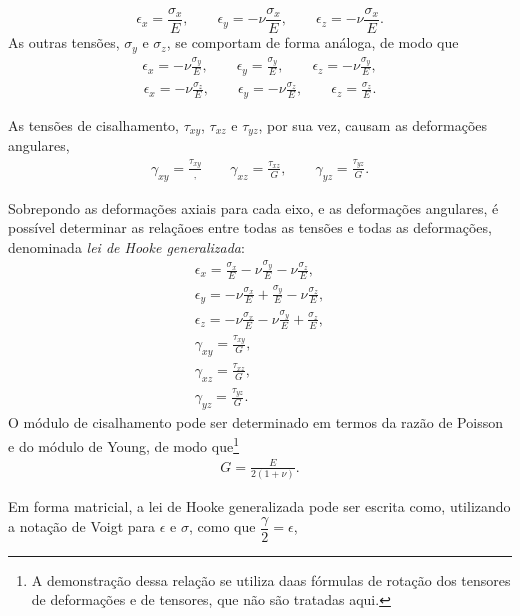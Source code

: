 \begin{equation}
    \epsilon_x =\frac{\sigma_x}{E}, \qquad \epsilon_y = -\nu \frac{\sigma_x}{E}, \qquad \epsilon_z = -\nu \frac{\sigma_x}{E}.
\end{equation}
As outras tensões, $\sigma_y$ e $\sigma_z$, se comportam de forma análoga, de modo que
\begin{gather}
    \epsilon_x =-\nu \frac{\sigma_y}{E}, \qquad \epsilon_y = \frac{\sigma_y}{E}, \qquad \epsilon_z = -\nu \frac{\sigma_y}{E}, 
\end{gather}
\begin{gather}
    \epsilon_x =-\nu \frac{\sigma_z}{E}, \qquad \epsilon_y = -\nu \frac{\sigma_z}{E}, \qquad \epsilon_z = \frac{\sigma_z}{E}.
\end{gather}

As tensões de cisalhamento, $\tau_{xy}$, $\tau_{xz}$ e $\tau_{yz}$, por sua vez, causam as deformações angulares,
\begin{gather}
    \gamma_{xy} = \frac{\tau_{xy}}, \qquad \gamma_{xz} = \frac{\tau_{xz}}{G}, \qquad \gamma_{yz} = \frac{\tau_{yz}}{G}.
\end{gather}

Sobrepondo as deformações axiais para cada eixo, e as deformações angulares, é possível determinar as relaçãoes entre todas as tensões e todas as deformações, denominada \emph{lei de Hooke generalizada}:
\begin{gather}
    \epsilon_x = \frac{\sigma_x}{E} - \nu \frac{\sigma_y}{E} - \nu \frac{\sigma_z}{E}, \\
    \epsilon_y = -\nu \frac{\sigma_x}{E} + \frac{\sigma_y}{E} - \nu \frac{\sigma_z}{E}, \\
    \epsilon_z = -\nu \frac{\sigma_x}{E} - \nu \frac{\sigma_y}{E} + \frac{\sigma_z}{E}, \\
    \gamma_{xy} = \frac{\tau_{xy}}{G}, \\ 
    \gamma_{xz} = \frac{\tau_{xz}}{G}, \\
    \gamma_{yz} = \frac{\tau_{yz}}{G}.
    \label{eq:lei_de_hooke_generalizada}
\end{gather}
O módulo de cisalhamento pode ser determinado em termos da razão de Poisson e do módulo de Young, de modo que\footnote{A demonstração dessa relação se utiliza daas fórmulas de rotação dos tensores de deformações e de tensores, que não são tratadas aqui.}
\begin{gather}
    G = \frac{E}{2(1+\nu)}.
\end{gather}

Em forma matricial, a lei de Hooke generalizada pode ser escrita como, utilizando a notação de Voigt para ${\epsilon}$ e ${\sigma}$, como que $\dfrac{\gamma}{2} = \epsilon$,

